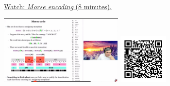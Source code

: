 
\begin{minipage}{10cm}
    \href{https://act4e-spring21.netlify.app/videos/spring2021-morphisms:morphisms:semigroup-morphisms:morse.html}{Watch: \emph{Morse encoding} (8 minutes).}
        
    \href{https://act4e-spring21.netlify.app/videos/spring2021-morphisms:morphisms:semigroup-morphisms:morse.html}{\includegraphics[height=3.5cm]{spring2021-morphisms:morphisms:semigroup-morphisms:morse/thumbnails.jpg}}
    \href{https://act4e-spring21.netlify.app/videos/spring2021-morphisms:morphisms:semigroup-morphisms:morse.html}{\includegraphics[height=2.5cm]{spring2021-morphisms:morphisms:semigroup-morphisms:morse/qrcode.png}}
\end{minipage}
